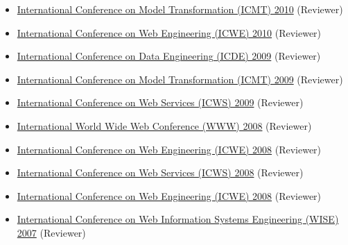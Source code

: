 \begin{itemize}
{  Driven Engineering Languages and Systems (MoDELS) 2010} (Reviewer)
\item
  \href{http://www.model-transformation.org/ICMT2010/}{International
  Conference on Model Transformation (ICMT) 2010} (Reviewer)
\item
  \href{http://icwe2010.webengineering.org/}{International Conference on
  Web Engineering (ICWE) 2010} (Reviewer)
\item
  \href{http://i.cs.hku.hk/icde2009/}{International Conference on Data
  Engineering (ICDE) 2009} (Reviewer)
\item
  \href{http://www.model-transformation.org/ICMT2009/}{International
  Conference on Model Transformation (ICMT) 2009} (Reviewer)
\item
  \href{http://www.servicescongress.org/2009/1/}{International
  Conference on Web Services (ICWS) 2009} (Reviewer)
\item
  \href{http://wwwconference.org/www2008/}{International World Wide Web
  Conference (WWW) 2008} (Reviewer)
\item
  \href{http://icwe2008.webengineering.org/}{International Conference on
  Web Engineering (ICWE) 2008} (Reviewer)
\item
  \href{http://www.servicescongress.org/2009/1/}{International
  Conference on Web Services (ICWS) 2008} (Reviewer)
\item
  \href{http://icwe.como.polimi.it/}{International Conference on Web
  Engineering (ICWE) 2008} (Reviewer)
\item
  \href{http://wise2007.loria.fr/pmwiki/pmwiki.php}{International
  Conference on Web Information Systems Engineering (WISE) 2007}
  (Reviewer)
\end{itemize}
